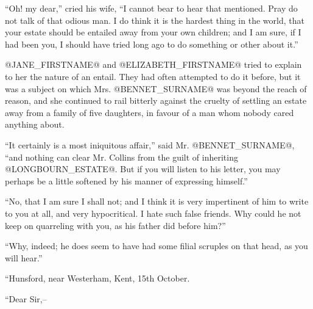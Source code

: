 ``Oh! my dear,'' cried his wife, ``I cannot bear to hear that mentioned.
Pray do not talk of that odious man. I do think it is the hardest thing
in the world, that your estate should be entailed away from your own
children; and I am sure, if I had been you, I should have tried long ago
to do something or other about it.''

@JANE_FIRSTNAME@ and @ELIZABETH_FIRSTNAME@ tried to explain to her the nature of an entail. They
had often attempted to do it before, but it was a subject on which
Mrs. @BENNET_SURNAME@ was beyond the reach of reason, and she continued to rail
bitterly against the cruelty of settling an estate away from a family of
five daughters, in favour of a man whom nobody cared anything about.

``It certainly is a most iniquitous affair,'' said Mr. @BENNET_SURNAME@, ``and
nothing can clear Mr. Collins from the guilt of inheriting @LONGBOURN_ESTATE@.
But if you will listen to his letter, you may perhaps be a little
softened by his manner of expressing himself.''

``No, that I am sure I shall not; and I think it is very impertinent of
him to write to you at all, and very hypocritical. I hate such false
friends. Why could he not keep on quarreling with you, as his father did
before him?''

``Why, indeed; he does seem to have had some filial scruples on that
head, as you will hear.''

``Hunsford, near Westerham, Kent, 15th October.

``Dear Sir,--


